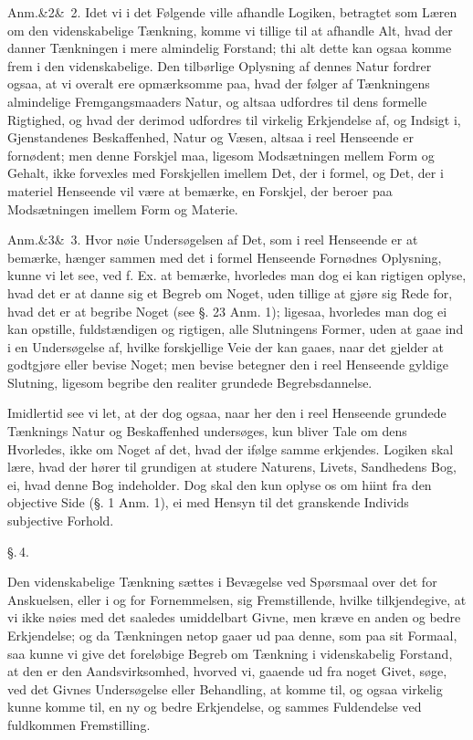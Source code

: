 \documentclass[12pt]{book}
\def\sperr#1{#1}%
\def\textit#1{#1}%
\def\emph#1{#1}%
\newcommand{\sperr}[1]{\textls[180]{#1}}
\newcommand{\parag}[1]{%
  \par\vspace{0.9\baselineskip}%
  {\centering\textit{\S.\,#1.}\par}%
  \vspace{0.35\baselineskip}%
  \noindent\hspace{\parindent}\ignorespaces
}
\newcommand{\anm}[1]{%
  \par\vspace{0.5\baselineskip}%
  \noindent\hspace{\parindent}\sperr{Anm.}\ifx&#1&\else~\textit{#1}.\fi
  \enspace\ignorespaces
}
\newcommand{\opage}[1]{\marginnote{\footnotesize\textit{[#1]}}}
\begin{document}
\anm{2} Idet vi i det Følgende ville afhandle Logiken, betragtet som Læren om
den videnskabelige Tænkning, komme vi tillige til at afhandle Alt, hvad der
danner Tænkningen i mere almindelig Forstand; thi alt dette kan ogsaa komme
frem i den videnskabelige. Den tilbørlige Oplysning af dennes Natur fordrer
ogsaa, at vi overalt ere opmærksomme paa, hvad der
\opage{9} følger af Tænkningens almindelige Fremgangsmaaders Natur, og altsaa udfordres
til dens formelle Rigtighed, og hvad der derimod udfordres til virkelig
Erkjendelse af, og Indsigt i, Gjenstandenes Beskaffenhed, Natur og Væsen,
altsaa i reel Henseende er fornødent; men denne Forskjel maa, ligesom
Modsætningen mellem \emph{Form} og \emph{Gehalt}, ikke forvexles med
Forskjellen imellem Det, der i formel, og Det, der i materiel Henseende vil
være at bemærke, en Forskjel, der beroer paa Modsætningen imellem \emph{Form}
og \emph{Materie}.

\anm{3} Hvor nøie Undersøgelsen af Det, som i reel Henseende er at bemærke,
hænger sammen med det i formel Henseende Fornødnes Oplysning, kunne vi let
see, ved f. Ex. at bemærke, hvorledes man dog ei kan rigtigen oplyse, hvad det
er at danne sig et Begreb \emph{om} Noget, uden tillige at gjøre sig Rede for,
hvad det er at \emph{begribe} Noget (see §. 23 Anm. 1); ligesaa, hvorledes man
dog ei kan opstille, fuldstændigen og rigtigen, alle Slutningens
\emph{Former}, uden at gaae ind i en Undersøgelse af, hvilke forskjellige Veie
der kan gaaes, naar det gjelder at godtgjøre eller bevise Noget; men
\emph{bevise} betegner den i reel Henseende gyldige Slutning, ligesom
\emph{begribe} den \textit{realiter} grundede Begrebsdannelse.

Imidlertid see vi let, at der dog ogsaa, naar her den i reel Henseende
grundede Tænknings Natur og Beskaffenhed undersøges, kun
\opage{10} bliver Tale om dens Hvorledes, ikke om Noget af det, hvad der ifølge samme
erkjendes. Logiken skal lære, hvad der hører til grundigen at studere
Naturens, Livets, Sandhedens Bog, ei, hvad denne Bog indeholder. Dog skal den
kun oplyse os om hiint fra den objective Side (§. 1 Anm. 1), ei med Hensyn til
det granskende Individs subjective Forhold.
\parag{4}
Den videnskabelige Tænkning sættes i Bevægelse ved Spørsmaal over det for
Anskuelsen, eller i og for Fornemmelsen, sig Fremstillende, hvilke
tilkjendegive, at vi ikke nøies med det saaledes umiddelbart Givne, men kræve
en anden og bedre Erkjendelse; og da Tænkningen netop gaaer ud paa denne, som
paa sit \emph{Formaal}, saa kunne vi give det foreløbige Begreb om Tænkning i
videnskabelig \emph{Forstand}, at den er den Aandsvirksomhed, hvorved vi,
gaaende ud fra noget Givet, søge, ved det Givnes Undersøgelse eller
Behandling, at komme til, og ogsaa virkelig kunne komme til, en ny og bedre
Erkjendelse, og sammes Fuldendelse ved fuldkommen Fremstilling.
\end{document}

